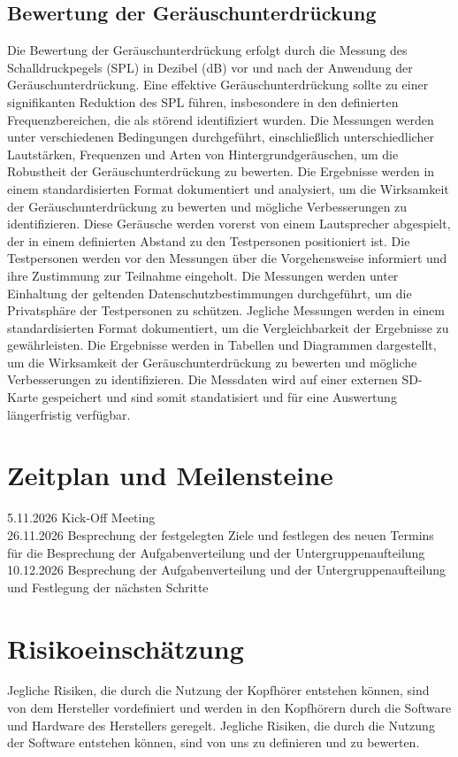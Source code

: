 \documentclass{article}
\begin{document}
    \subsection{Bewertung der Geräuschunterdrückung}
    Die Bewertung der Geräuschunterdrückung erfolgt durch die Messung des Schalldruckpegels (SPL) in Dezibel (dB) vor und nach der Anwendung der Geräuschunterdrückung. Eine effektive Geräuschunterdrückung sollte zu einer signifikanten Reduktion des SPL führen, insbesondere in den definierten Frequenzbereichen, die als störend identifiziert wurden. Die Messungen werden unter verschiedenen Bedingungen durchgeführt, einschließlich unterschiedlicher Lautstärken, Frequenzen und Arten von Hintergrundgeräuschen, um die Robustheit der Geräuschunterdrückung zu bewerten. Die Ergebnisse werden in einem standardisierten Format dokumentiert und analysiert, um die Wirksamkeit der Geräuschunterdrückung zu bewerten und mögliche Verbesserungen zu identifizieren.
    Diese Geräusche werden vorerst von einem Lautsprecher abgespielt, der in einem definierten Abstand zu den Testpersonen positioniert ist. Die Testpersonen werden vor den Messungen über die Vorgehensweise informiert und ihre Zustimmung zur Teilnahme eingeholt. Die Messungen werden unter Einhaltung der geltenden Datenschutzbestimmungen durchgeführt, um die Privatsphäre der Testpersonen zu schützen. Jegliche Messungen werden in einem standardisierten Format dokumentiert, um die Vergleichbarkeit der Ergebnisse zu gewährleisten. Die Ergebnisse werden in Tabellen und Diagrammen dargestellt, um die Wirksamkeit der Geräuschunterdrückung zu bewerten und mögliche Verbesserungen zu identifizieren.
    Die Messdaten wird auf einer externen SD-Karte gespeichert und sind somit standatisiert und für eine Auswertung längerfristig verfügbar.


\section{Zeitplan und Meilensteine}
5.11.2026 Kick-Off Meeting\\
26.11.2026 Besprechung der festgelegten Ziele und festlegen des neuen Termins für die Besprechung der Aufgabenverteilung und der Untergruppenaufteilung\\
10.12.2026 Besprechung der Aufgabenverteilung und der Untergruppenaufteilung und Festlegung der nächsten Schritte\\


\section{Risikoeinschätzung}
Jegliche Risiken, die durch die Nutzung der Kopfhörer entstehen können, sind von dem Hersteller vordefiniert und werden in den Kopfhörern durch die Software und Hardware des Herstellers geregelt. Jegliche Risiken, die durch die Nutzung der Software entstehen können, sind von uns zu definieren und zu bewerten. 
\end{document}
